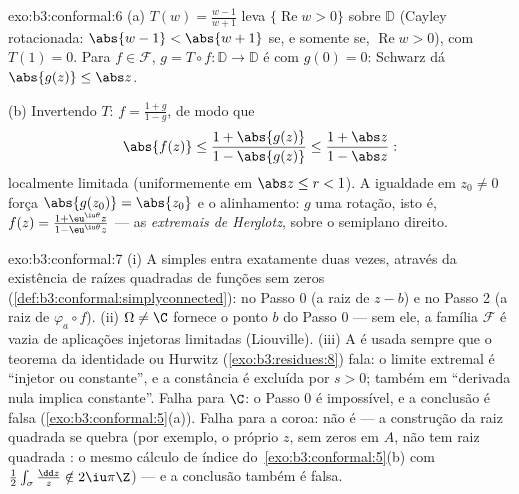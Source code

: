 \begin{solution}{exo:b3:conformal:6}
(a) $T(w) = \frac{w - 1}{w + 1}$ leva $\{\operatorname{Re}w >
0\}$  sobre $\mathbb D$ (Cayley rotacionada: $\abs{w -
1} < \abs{w + 1}$ se, e somente se, $\operatorname{Re}w > 0$), com $T(1) =
0$. Para $f \in \mathcal F$, $g = T\circ f\colon \mathbb D \to
\mathbb D$ é  com $g(0) = 0$: Schwarz dá
$\abs{g(z)} \leq \abs z$.

(b) Invertendo $T$: $f = \frac{1 + g}{1 - g}$, de modo que
\[
\abs{f(z)} \leq \frac{1 + \abs{g(z)}}{1 - \abs{g(z)}}
\leq \frac{1 + \abs z}{1 - \abs z} :
\]
localmente limitada (uniformemente em $\abs z \leq r < 1$). A igualdade
em $z_0 \neq 0$ força $\abs{g(z_0)} = \abs{z_0}$ e o
alinhamento: $g$ uma rotação, isto é, $f(z) = \frac{1 +
\eu^{\iu\theta}z}{1 - \eu^{\iu\theta}z}$ --- as
\emph{extremais de Herglotz},  sobre o semiplano
direito.
\end{solution}

\begin{solution}{exo:b3:conformal:7}
(i) A  simples entra exatamente duas vezes, através da
existência de raízes quadradas  de funções sem zeros
(\cref{def:b3:conformal:simplyconnected}): no Passo 0 (a raiz
de $z - b$) e no Passo 2 (a raiz de $\varphi_a\circ f$).
(ii) $\Omega \neq \C$ fornece o ponto $b$ do Passo 0 ---
sem ele, a família $\mathcal F$ é vazia de aplicações injetoras
limitadas (Liouville). (iii) A  é usada sempre que
o teorema da identidade ou Hurwitz (\cref{exo:b3:residues:8})
fala: o limite extremal é ``injetor ou constante'', e
a constância é excluída por $s > 0$; também em ``derivada nula
implica constante''. Falha para $\C$: o Passo 0 é impossível, e
a conclusão é falsa (\cref{exo:b3:conformal:5}(a)).
Falha para a coroa: não é  --- a
construção da raiz quadrada se quebra (por exemplo, o próprio $z$, sem zeros
em $A$, não tem raiz quadrada : o mesmo cálculo de índice
do~\cref{exo:b3:conformal:5}(b) com
$\frac12\int_\sigma\frac{\dd z}z \notin 2\iu\pi\Z$) --- e
a conclusão também é falsa.
\end{solution}

